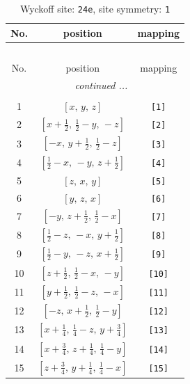 \documentclass[fleqn,8pt]{jsarticle}
\begin{document}
\begin{longtable}{ccc}
\caption{Wyckoff site: {\tt 24e}, site symmetry: {\tt 1}}
 \\
 \hline \hline
No. & position & mapping \\ \hline \endfirsthead

\multicolumn{2}{l}{\tablename\ \thetable{}} \\
 \hline \hline
No. & position & mapping \\ \hline \endhead

 \hline \hline
\multicolumn{2}{r}{\footnotesize\it continued ...} \\ \endfoot

 \hline \hline
\multicolumn{2}{r}{} \\ \endlastfoot

1 & $\left[ x,\, y,\, z \right]$ & {\tt [1]} \\ \hline
2 & $\left[ x + \frac{1}{2},\, \frac{1}{2} - y,\, - z \right]$ & {\tt [2]} \\ \hline
3 & $\left[ - x,\, y + \frac{1}{2},\, \frac{1}{2} - z \right]$ & {\tt [3]} \\ \hline
4 & $\left[ \frac{1}{2} - x,\, - y,\, z + \frac{1}{2} \right]$ & {\tt [4]} \\ \hline
5 & $\left[ z,\, x,\, y \right]$ & {\tt [5]} \\ \hline
6 & $\left[ y,\, z,\, x \right]$ & {\tt [6]} \\ \hline
7 & $\left[ - y,\, z + \frac{1}{2},\, \frac{1}{2} - x \right]$ & {\tt [7]} \\ \hline
8 & $\left[ \frac{1}{2} - z,\, - x,\, y + \frac{1}{2} \right]$ & {\tt [8]} \\ \hline
9 & $\left[ \frac{1}{2} - y,\, - z,\, x + \frac{1}{2} \right]$ & {\tt [9]} \\ \hline
10 & $\left[ z + \frac{1}{2},\, \frac{1}{2} - x,\, - y \right]$ & {\tt [10]} \\ \hline
11 & $\left[ y + \frac{1}{2},\, \frac{1}{2} - z,\, - x \right]$ & {\tt [11]} \\ \hline
12 & $\left[ - z,\, x + \frac{1}{2},\, \frac{1}{2} - y \right]$ & {\tt [12]} \\ \hline
13 & $\left[ x + \frac{1}{4},\, \frac{1}{4} - z,\, y + \frac{3}{4} \right]$ & {\tt [13]} \\ \hline
14 & $\left[ x + \frac{3}{4},\, z + \frac{1}{4},\, \frac{1}{4} - y \right]$ & {\tt [14]} \\ \hline
15 & $\left[ z + \frac{3}{4},\, y + \frac{1}{4},\, \frac{1}{4} - x \right]$ & {\tt [15]} \\ \hline

\end{longtable}
\end{document}
